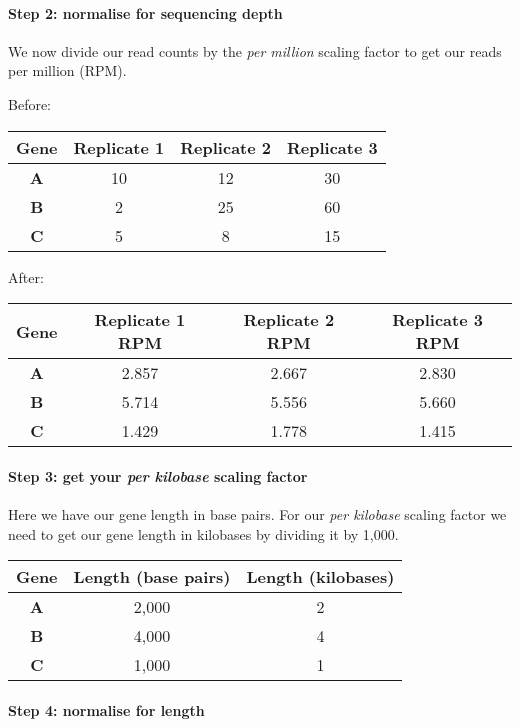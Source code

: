\documentclass[11pt]{article}
\begin{document}
\hypertarget{step-2-normalise-for-sequencing-depth}{%
\paragraph{Step 2: normalise for sequencing
depth}\label{step-2-normalise-for-sequencing-depth}}

We now divide our read counts by the \textit{per million} scaling factor
to get our reads per million (RPM).

Before:

\begin{longtable}[]{@{}cccc@{}}
\hline
Gene & Replicate 1 & Replicate 2 & Replicate 3\tabularnewline
\hline
\endhead
\textbf{A} & 10 & 12 & 30\tabularnewline
\textbf{B} & 2 & 25 & 60\tabularnewline
\textbf{C} & 5 & 8 & 15\tabularnewline
\hline
\end{longtable}

After:

\begin{longtable}[]{@{}cccc@{}}
\hline
Gene & Replicate 1 RPM & Replicate 2 RPM & Replicate 3
RPM\tabularnewline
\hline
\endhead
\textbf{A} & 2.857 & 2.667 & 2.830\tabularnewline
\textbf{B} & 5.714 & 5.556 & 5.660\tabularnewline
\textbf{C} & 1.429 & 1.778 & 1.415\tabularnewline
\hline
\end{longtable}

\hypertarget{step-3-get-your-per-kilobase-scaling-factor}{%
\paragraph{\texorpdfstring{Step 3: get your \textit{per kilobase} scaling
factor}{Step 3: get your per kilobase scaling factor}}\label{step-3-get-your-per-kilobase-scaling-factor}}

Here we have our gene length in base pairs. For our \textit{per kilobase}
scaling factor we need to get our gene length in kilobases by dividing
it by 1,000.

\begin{longtable}[]{@{}ccc@{}}
\hline
Gene & Length (base pairs) & Length (kilobases)\tabularnewline
\hline
\endhead
\textbf{A} & 2,000 & 2\tabularnewline
\textbf{B} & 4,000 & 4\tabularnewline
\textbf{C} & 1,000 & 1\tabularnewline
\hline
\end{longtable}

\hypertarget{step-4-normalise-for-length}{%
\paragraph{Step 4: normalise for
length}\label{step-4-normalise-for-length}}
\end{document}
